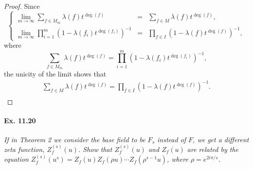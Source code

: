 \documentclass[11pt,a4paper]{article}
\begin{document}
\begin{proof}
 Since
 $$
 \left\{
 \begin{array}{lcl}
\lim\limits_{m\to \infty} \sum\limits_{f \in M_m} \lambda(f) t^{\deg(f)}  &= & \sum\limits_{f \in M} \lambda(f) t^{\deg(f)},\\
\lim\limits_{m \to \infty} \prod\limits_{i=1}^m \left( 1 - \lambda(f_i) t^{\deg(f_i)} \right)^{-1} &=& \prod\limits_{f \in I} (1 - \lambda(f) t^{\deg(f)})^{-1},
\end{array}
\right.
$$
where 
$$\sum_{f \in M_m} \lambda(f) t^{\deg(f)} = \prod_{i=1}^m \left( 1 - \lambda(f_i) t^{\deg(f_i)} \right)^{-1},$$
 the unicity of the limit shows that
\begin{align*}
\sum_{f \in M} \lambda(f) t^{\deg(f)} = \prod_{f \in I} (1 - \lambda(f) t^{\deg(f)})^{-1}.\\
\end{align*}

\end{proof}


\paragraph{Ex. 11.20}{\it If in Theorem 2 we consider the base field to be $F_s$ instead of $F$, we get a different zeta function, $Z_f^{(s)}(u)$. Show that $Z_f^{(s)}(u)$ and $Z_f(u)$ are related by the equation $Z_f^{(s)}(u^s) = Z_f(u)Z_f(\rho u)\cdots Z_f(\rho^{s-1} u)$, where $\rho = e^{2i\pi/s}$.
}
\end{document}
